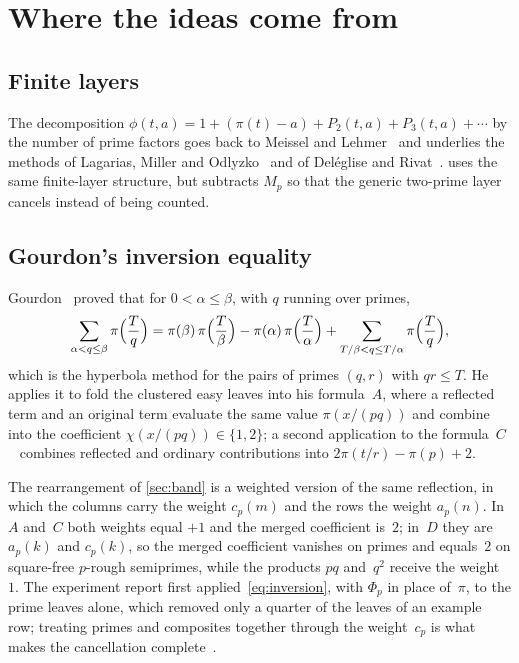\documentclass[11pt,a4paper]{amsart}
\numberwithin{equation}{section}
\begin{document}
\section{Where the ideas come from}\label{sec:prior}

\subsection{Finite layers}
The decomposition $\phi(t,a)=1+(\pi(t)-a)+P_2(t,a)+P_3(t,a)+\dotsb$ by the number
of prime factors goes back to Meissel and Lehmer~\cite{Lehmer1959} and underlies
the methods of Lagarias, Miller and Odlyzko~\cite{LMO1985} and of Del\'eglise
and Rivat~\cite{DR1996}.  uses the same finite-layer
structure, but subtracts $M_p$ so that the generic two-prime layer cancels
instead of being counted.

\subsection{Gourdon's inversion equality}
Gourdon~\cite[Lemma~1]{Gourdon2001} proved that for $0<\alpha\le\beta$, with
$q$ running over primes,
\begin{equation}\label{eq:inversion}
  \sum_{\alpha<q\le\beta}\pi\Bigl(\frac Tq\Bigr)
  =\pi(\beta)\,\pi\Bigl(\frac T\beta\Bigr)-\pi(\alpha)\,\pi\Bigl(\frac T\alpha\Bigr)
  +\sum_{T/\beta<q\le T/\alpha}\pi\Bigl(\frac Tq\Bigr),
\end{equation}
which is the hyperbola method for the pairs of primes $(q,r)$ with $qr\le T$.
He applies it to fold the clustered easy leaves into his formula~$A$, where a
reflected term and an original term evaluate the same value $\pi(x/(pq))$ and
combine into the coefficient $\chi(x/(pq))\in\{1,2\}$; a second application to
the formula~$C$~\cite[\S6]{Walisch2026easy} combines reflected and ordinary
contributions into $2\pi(t/r)-\pi(p)+2$.

The rearrangement of \cref{sec:band} is a weighted version of the same
reflection, in which the columns carry the weight $c_p(m)$ and the rows the
weight $a_p(n)$. In $A$ and~$C$ both weights equal $+1$ and the merged
coefficient is~$2$; in~$D$ they are $a_p(k)$ and $c_p(k)$, so the merged
coefficient vanishes on primes and equals~$2$ on square-free $p$-rough
semiprimes, while the products $pq$ and~$q^2$ receive the weight~$1$. The
experiment report first applied~\eqref{eq:inversion}, with $\Phi_p$ in place
of~$\pi$, to the prime leaves alone, which removed only a quarter of the leaves
of an example row; treating primes and composites together through the
weight~$c_p$ is what makes the cancellation complete~\cite[\S7]{Lin2026}.
\end{document}
